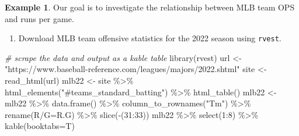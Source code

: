 \documentclass[
  11pt,
]{book}
\newenvironment{Shaded}{\begin{snugshade}}{\end{snugshade}}
\newcommand{\AttributeTok}[1]{\textcolor[rgb]{0.77,0.63,0.00}{#1}}
\newcommand{\CommentTok}[1]{\textcolor[rgb]{0.56,0.35,0.01}{\textit{#1}}}
\newcommand{\DecValTok}[1]{\textcolor[rgb]{0.00,0.00,0.81}{#1}}
\newcommand{\FunctionTok}[1]{\textcolor[rgb]{0.00,0.00,0.00}{#1}}
\newcommand{\NormalTok}[1]{#1}
\newcommand{\OtherTok}[1]{\textcolor[rgb]{0.56,0.35,0.01}{#1}}
\newcommand{\SpecialCharTok}[1]{\textcolor[rgb]{0.00,0.00,0.00}{#1}}
\newcommand{\StringTok}[1]{\textcolor[rgb]{0.31,0.60,0.02}{#1}}
\providecommand{\tightlist}{%
  \setlength{\itemsep}{0pt}\setlength{\parskip}{0pt}}
\theoremstyle{definition}
\theoremstyle{definition}
\newtheorem{example}{Example}[chapter]
\theoremstyle{definition}
\theoremstyle{definition}
\theoremstyle{remark}
\begin{document}
\newpage

\begin{example}
Our goal is to investigate the relationship between MLB team OPS and runs per game.
\end{example}

\begin{enumerate}
\def\labelenumi{(\alph{enumi})}
\tightlist
\item
  Download MLB team offensive statistics for the 2022 season using \texttt{rvest}.
\end{enumerate}

\begin{Shaded}
\begin{Highlighting}[]
\CommentTok{\# scrape the data and output as a kable table}
\FunctionTok{library}\NormalTok{(rvest)}
\NormalTok{url }\OtherTok{\textless{}{-}} \StringTok{"https://www.baseball{-}reference.com/leagues/majors/2022.shtml"}
\NormalTok{site }\OtherTok{\textless{}{-}} \FunctionTok{read\_html}\NormalTok{(url)}
\NormalTok{mlb22 }\OtherTok{\textless{}{-}}\NormalTok{ site }\SpecialCharTok{\%\textgreater{}\%} \FunctionTok{html\_elements}\NormalTok{(}\StringTok{"\#teams\_standard\_batting"}\NormalTok{) }\SpecialCharTok{\%\textgreater{}\%} \FunctionTok{html\_table}\NormalTok{()}
\NormalTok{mlb22 }\OtherTok{\textless{}{-}}\NormalTok{ mlb22 }\SpecialCharTok{\%\textgreater{}\%} \FunctionTok{data.frame}\NormalTok{() }\SpecialCharTok{\%\textgreater{}\%} \FunctionTok{column\_to\_rownames}\NormalTok{(}\StringTok{"Tm"}\NormalTok{) }\SpecialCharTok{\%\textgreater{}\%}
  \FunctionTok{rename}\NormalTok{(}\StringTok{\textasciigrave{}}\AttributeTok{R/G}\StringTok{\textasciigrave{}}\OtherTok{=}\NormalTok{R.G) }\SpecialCharTok{\%\textgreater{}\%} \FunctionTok{slice}\NormalTok{(}\SpecialCharTok{{-}}\NormalTok{(}\DecValTok{31}\SpecialCharTok{:}\DecValTok{33}\NormalTok{))}
\NormalTok{mlb22 }\SpecialCharTok{\%\textgreater{}\%} \FunctionTok{select}\NormalTok{(}\DecValTok{1}\SpecialCharTok{:}\DecValTok{8}\NormalTok{) }\SpecialCharTok{\%\textgreater{}\%} \FunctionTok{kable}\NormalTok{(}\AttributeTok{booktabs=}\NormalTok{T)}
\end{Highlighting}
\end{Shaded}
\end{document}
